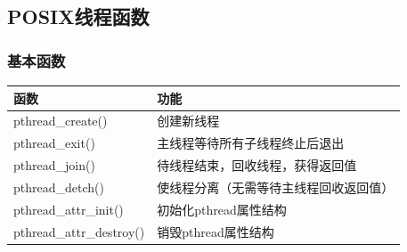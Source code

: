 \documentclass{article}
\begin{document}
\subsection{POSIX线程函数}
\subsubsection{基本函数}
\begin{tabular}[H]{|l|l|}%
	\hline  %
	函数                     & 功能\\
	\hline
	pthread\_create()        & 创建新线程\\
	\hline
	pthread\_exit()          & 主线程等待所有子线程终止后退出         \\
	\hline
	pthread\_join()          & 待线程结束，回收线程，获得返回值       \\
	\hline
	pthread\_detch()         & 使线程分离（无需等待主线程回收返回值） \\
	\hline
	pthread\_attr\_init()    & 初始化pthread属性结构                  \\
	\hline
	pthread\_attr\_destroy() & 销毁pthread属性结构                    \\
	\hline  %
\end{tabular}
\end{document}
